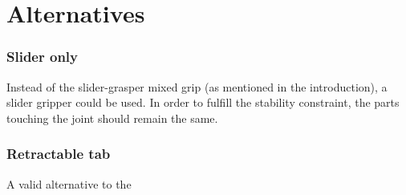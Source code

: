 \section{Alternatives}

\subsubsection*{Slider only}
Instead of the slider-grasper mixed grip (as mentioned in the introduction), a slider gripper could be used. In order to fulfill the stability constraint, the parts touching the joint should remain the same.

\subsubsection*{Retractable tab}
A valid alternative to the 